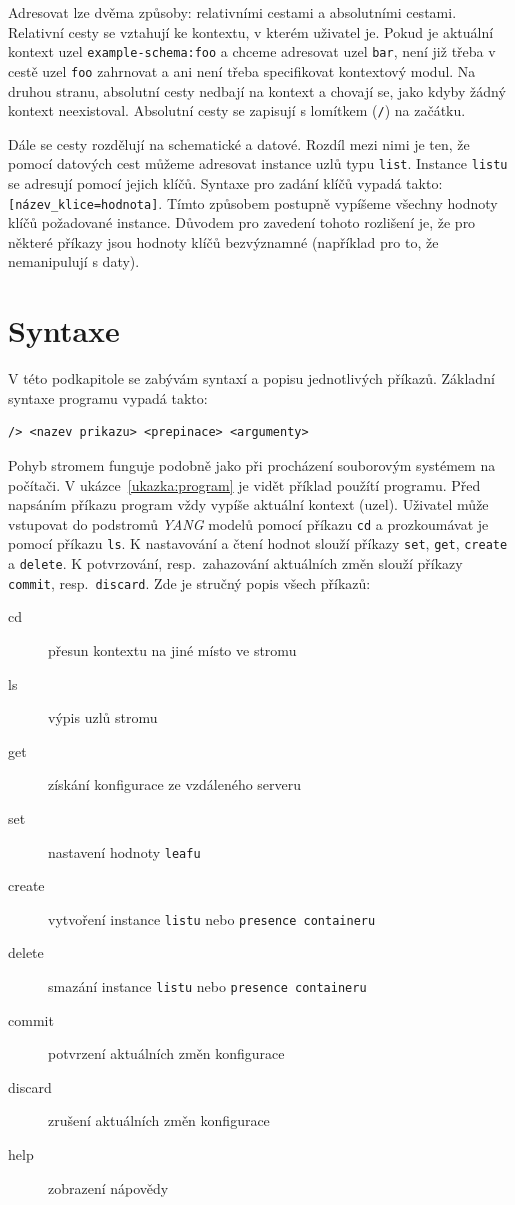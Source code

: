 \documentclass[thesis=B,czech,hidelinks]{FITthesis}[2019/03/06]
\begin{document}
Adresovat lze dvěma způsoby: relativními cestami a absolutními cestami. Relativní cesty se vztahují ke kontextu, v kterém uživatel je. Pokud je aktuální kontext uzel \texttt{example-schema:foo} a chceme adresovat uzel \texttt{bar}, není již třeba v cestě uzel \texttt{foo} zahrnovat a ani není třeba specifikovat kontextový modul. Na druhou stranu, absolutní cesty nedbají na kontext a chovají se, jako kdyby žádný kontext neexistoval. Absolutní cesty se zapisují s lomítkem (\texttt{/}) na začátku.

Dále se cesty rozdělují na schematické a datové. Rozdíl mezi nimi je ten, že pomocí datových cest můžeme adresovat instance uzlů typu \texttt{list}. Instance \texttt{listu} se adresují pomocí jejich klíčů. Syntaxe pro zadání klíčů vypadá takto: \verb¨[název_klice=hodnota]¨. Tímto způsobem postupně vypíšeme všechny hodnoty klíčů požadované instance. Důvodem pro zavedení tohoto rozlišení je, že pro některé příkazy jsou hodnoty klíčů bezvýznamné (například pro to, že nemanipulují s daty).

\section{Syntaxe}\label{syntaxe}
V této podkapitole se zabývám syntaxí a popisu jednotlivých příkazů. Základní syntaxe programu vypadá takto:
\begin{verbatim}
/> <nazev prikazu> <prepinace> <argumenty>
\end{verbatim}
Pohyb stromem funguje podobně jako při procházení souborovým systémem na počítači. V ukázce~\ref{ukazka:program} je vidět příklad použítí programu. Před napsáním příkazu program vždy vypíše aktuální kontext (uzel). Uživatel může vstupovat do podstromů \textit{YANG} modelů pomocí příkazu \texttt{cd} a prozkoumávat je pomocí příkazu \texttt{ls}. K nastavování a čtení hodnot slouží příkazy \texttt{set}, \texttt{get}, \texttt{create} a \texttt{delete}. K potvrzování, resp.\ zahazování aktuálních změn slouží příkazy \texttt{commit}, resp.\ \texttt{discard}. Zde je stručný popis všech příkazů:
\begin{description}
\item[cd]{přesun kontextu na jiné místo ve stromu}
\item[ls]{výpis uzlů stromu}
\item[get]{získání konfigurace ze vzdáleného serveru}
\item[set]{nastavení hodnoty \texttt{leafu}}
\item[create]{vytvoření instance \texttt{listu} nebo \texttt{presence containeru}}
\item[delete]{smazání instance \texttt{listu} nebo \texttt{presence containeru}}
\item[commit]{potvrzení aktuálních změn konfigurace}
\item[discard]{zrušení aktuálních změn konfigurace}
\item[help]{zobrazení nápovědy}
\end{description}
\end{document}
